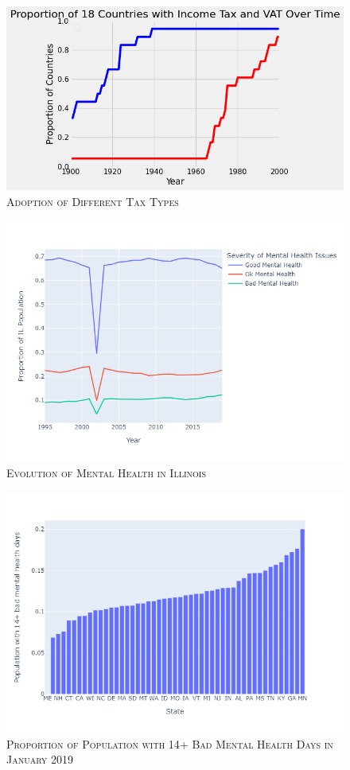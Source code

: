\documentclass{article}[12pt]
\begin{document}
\begin{figure}
    \centering
    \caption{\textsc{Adoption of Different Tax Types}}
    \label{fig:tax2}
    \includegraphics[scale=0.6]{tax.png}
    \hspace{0.5cm}
\end{figure}

\begin{figure}
    \centering
    \caption{\textsc{Evolution of Mental Health in Illinois}}
    \label{fig:IL}
    \includegraphics[scale=0.6]{fig2.png}
    \hspace{0.5cm}
\end{figure}

\begin{figure}
    \centering
    \caption{\textsc{Proportion of Population with 14+ Bad Mental Health Days in January 2019}}
    \label{fig:mental}
    \includegraphics[scale=0.6]{fig3.png}
    \hspace{0.5cm}
\end{figure}
\end{document}

